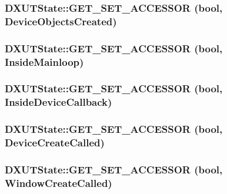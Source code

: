\label{class_d_x_u_t_state_a4c31ee243c293f73584d675041eaea2b}
\hypertarget{class_d_x_u_t_state_a07b477d9aa86b43b42ed3178c15e8482}{
\subsubsection[{GET\_\-SET\_\-ACCESSOR}]{\setlength{\rightskip}{0pt plus 5cm}DXUTState::GET\_\-SET\_\-ACCESSOR (bool, \/  DeviceObjectsCreated)}}
\label{class_d_x_u_t_state_a07b477d9aa86b43b42ed3178c15e8482}
\hypertarget{class_d_x_u_t_state_a6474dc67d3b1b2572a8bb2476709b516}{
\subsubsection[{GET\_\-SET\_\-ACCESSOR}]{\setlength{\rightskip}{0pt plus 5cm}DXUTState::GET\_\-SET\_\-ACCESSOR (bool, \/  InsideMainloop)}}
\label{class_d_x_u_t_state_a6474dc67d3b1b2572a8bb2476709b516}
\hypertarget{class_d_x_u_t_state_ae57476aa86bbfa1a7cc419d387a2d0ee}{
\subsubsection[{GET\_\-SET\_\-ACCESSOR}]{\setlength{\rightskip}{0pt plus 5cm}DXUTState::GET\_\-SET\_\-ACCESSOR (bool, \/  InsideDeviceCallback)}}
\label{class_d_x_u_t_state_ae57476aa86bbfa1a7cc419d387a2d0ee}
\hypertarget{class_d_x_u_t_state_a6dfe7e675d3521ea6c945041a4e8ebeb}{
\subsubsection[{GET\_\-SET\_\-ACCESSOR}]{\setlength{\rightskip}{0pt plus 5cm}DXUTState::GET\_\-SET\_\-ACCESSOR (bool, \/  DeviceCreateCalled)}}
\label{class_d_x_u_t_state_a6dfe7e675d3521ea6c945041a4e8ebeb}
\hypertarget{class_d_x_u_t_state_a5a0a83f318432262f0d1936453b5b776}{
\subsubsection[{GET\_\-SET\_\-ACCESSOR}]{\setlength{\rightskip}{0pt plus 5cm}DXUTState::GET\_\-SET\_\-ACCESSOR (bool, \/  WindowCreateCalled)}}
